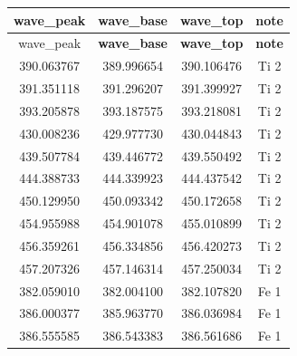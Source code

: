 \documentclass[12pt,oneside,openany,letter]{book}
\begin{document}
\begin{longtable}[]{|c|c|c|c|}
\hline
\textbf{wave\_peak}                       & \textbf{wave\_base}             & \textbf{wave\_top}              & \textbf{note}             \\ \hline
\endfirsthead

\hline
wave\_peak                       & \textbf{wave\_base}             & \textbf{wave\_top}              & \textbf{note}             \\ \hline
\endhead


390.063767                       & 389.996654                      & 390.106476                      & Ti 2                      \\ \hline
391.351118                       & 391.296207                      & 391.399927                      & Ti 2                      \\ \hline
393.205878                       & 393.187575                      & 393.218081                      & Ti 2                      \\ \hline
430.008236                       & 429.977730                      & 430.044843                      & Ti 2                      \\ \hline
439.507784                       & 439.446772                      & 439.550492                      & Ti 2                      \\ \hline
444.388733                       & 444.339923                      & 444.437542                      & Ti 2                      \\ \hline
450.129950                       & 450.093342                      & 450.172658                      & Ti 2                      \\ \hline
454.955988                       & 454.901078                      & 455.010899                      & Ti 2                      \\ \hline
456.359261                       & 456.334856                      & 456.420273                      & Ti 2                      \\ \hline
457.207326                       & 457.146314                      & 457.250034                      & Ti 2                      \\ \hline
382.059010 & 382.004100 & 382.107820 & Fe 1 \\ \hline
386.000377 & 385.963770 & 386.036984 & Fe 1 \\ \hline
386.555585 & 386.543383 & 386.561686 & Fe 1 \\ \hline

\end{longtable}
\end{document}
